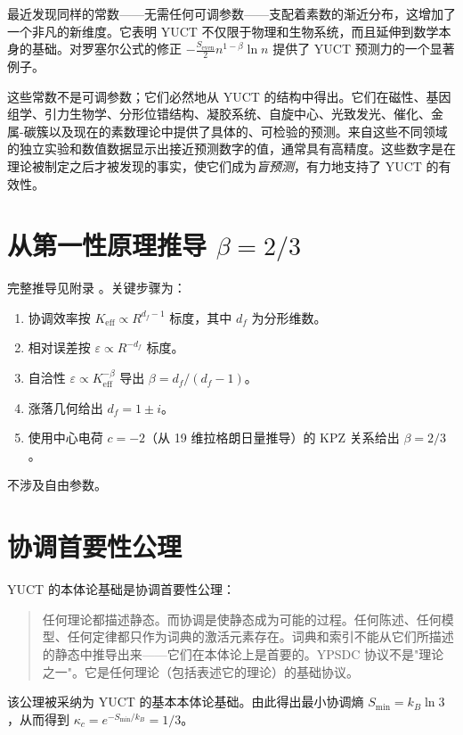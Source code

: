 \documentclass[12pt,a4paper]{article}
\begin{document}
	最近发现同样的常数——无需任何可调参数——支配着素数的渐近分布，这增加了一个非凡的新维度。它表明 YUCT 不仅限于物理和生物系统，而且延伸到数学本身的基础。对罗塞尔公式的修正 \(-\frac{S_{\text{even}}}{2}n^{1-\beta}\ln n\) 提供了 YUCT 预测力的一个显著例子。
	
	这些常数不是可调参数；它们必然地从 YUCT 的结构中得出。它们在磁性、基因组学、引力生物学、分形位错结构、凝胶系统、自旋中心、光致发光、催化、金属-碳簇以及现在的素数理论中提供了具体的、可检验的预测。来自这些不同领域的独立实验和数值数据显示出接近预测数字的值，通常具有高精度。这些数字是在理论被制定之后才被发现的事实，使它们成为\textit{盲预测}，有力地支持了 YUCT 的有效性。
	
	\appendix
	\section{从第一性原理推导 \(\beta = 2/3\)}
	\label{app:beta_derivation}
	完整推导见附录 \cite{AppendixL, AppendixY}。关键步骤为：
	\begin{enumerate}
		\item 协调效率按 \(K_{\mathrm{eff}} \propto R^{d_f-1}\) 标度，其中 \(d_f\) 为分形维数。
		\item 相对误差按 \(\varepsilon \propto R^{-d_f}\) 标度。
		\item 自洽性 \(\varepsilon \propto K_{\mathrm{eff}}^{-\beta}\) 导出 \(\beta = d_f/(d_f-1)\)。
		\item 涨落几何给出 \(d_f = 1 \pm i\)。
		\item 使用中心电荷 \(c = -2\)（从 19 维拉格朗日量推导）的 KPZ 关系给出 \(\beta = 2/3\)。
	\end{enumerate}
	不涉及自由参数。
	
	\section{协调首要性公理}
	\label{app:axiom}
	YUCT 的本体论基础是协调首要性公理：
	\begin{quote}
		任何理论都描述静态。而协调是使静态成为可能的过程。任何陈述、任何模型、任何定律都只作为词典的激活元素存在。词典和索引不能从它们所描述的静态中推导出来——它们在本体论上是首要的。YPSDC 协议不是"理论之一"。它是任何理论（包括表述它的理论）的基础协议。
	\end{quote}
	该公理被采纳为 YUCT 的基本本体论基础。由此得出最小协调熵 \(S_{\min} = k_B \ln 3\)，从而得到 \(\kappa_c = e^{-S_{\min}/k_B} = 1/3\)。
	
\end{document}
